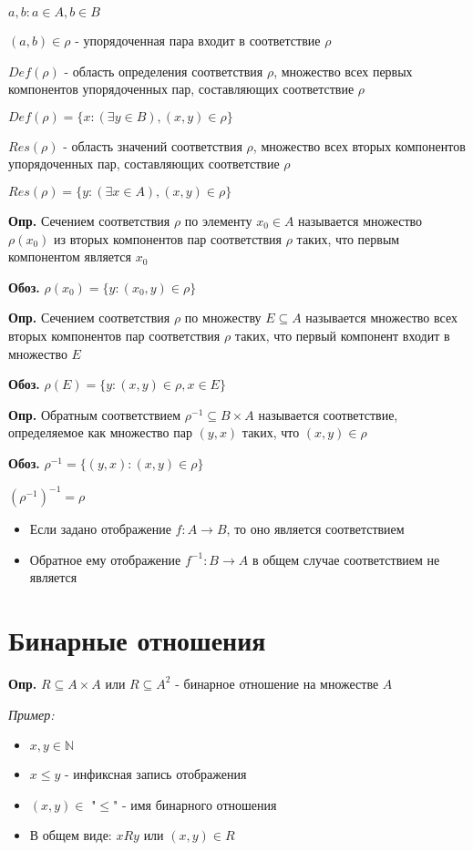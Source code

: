 \documentclass[10pt]{article}
\begin{document}
\par $a, b: a \in A, b \in B$
\par $(a, b) \in \rho$ - упорядоченная пара входит в соответствие $\rho$
\par $Def(\rho)$ - область определения соответствия $\rho$, множество всех первых компонентов упорядоченных пар, составляющих соответствие $\rho$
\par $Def(\rho) = \{ x: (\exists y \in B), (x, y) \in \rho \}$
\par $Res(\rho)$ - область значений соответствия $\rho$, множество всех вторых компонентов упорядоченных пар, составляющих соответствие $\rho$
\par $Res(\rho) = \{ y: (\exists x \in A), (x, y) \in \rho \}$
\par
\par\textbf{Опр.} Сечением соответствия $\rho$ по элементу $x_0 \in A$ называется множество $\rho(x_0)$ из вторых компонентов пар соответствия $\rho$ таких, что первым компонентом является $x_0$
\par\textbf{Обоз.} $\rho(x_0) = \{ y: (x_0, y) \in \rho \}$

\par\textbf{Опр.} Сечением соответствия $\rho$ по множеству $E \subseteq A$ называется множество всех вторых компонентов пар соответствия $\rho$ таких, что первый компонент входит в множество $E$
\par\textbf{Обоз.} $\rho(E) = \{ y: (x, y) \in \rho, x \in E \}$

\par\textbf{Опр.} Обратным соответствием $\rho^{-1} \subseteq B \times A$ называется соответствие, определяемое как множество пар $(y, x)$ таких, что $(x, y) \in \rho$
\par\textbf{Обоз.} $\rho^{-1} = \{ (y, x): (x, y) \in \rho \}$
\par $(\rho^{-1})^{-1} = \rho$

\begin{itemize}
    \item Если задано отображение $f: A \rightarrow B$, то оно является соответствием
    \item Обратное ему отображение $f^{-1}: B \rightarrow A$ в общем случае соответствием не является
\end{itemize}

\section*{Бинарные отношения}
\par\textbf{Опр.} $R \subseteq A \times A$ или $R \subseteq A^2$ - бинарное отношение на множестве $A$
\par\textit{Пример:}
\begin{itemize}
    \item $x, y \in \mathbb{N}$
    \item $x \leq y$ - инфиксная запись отображения
    \item $(x, y) \in$ "$\leq$" - имя бинарного отношения
    \item В общем виде: $xRy$ или $(x, y) \in R$
\end{itemize}
\end{document}
